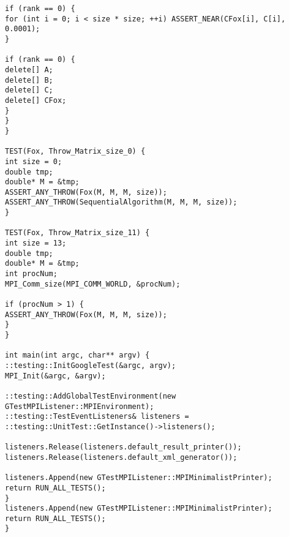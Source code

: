 \documentclass{report}
\begin{document}
\begin{lstlisting}
if (rank == 0) {
for (int i = 0; i < size * size; ++i) ASSERT_NEAR(CFox[i], C[i], 0.0001);
}

if (rank == 0) {
delete[] A;
delete[] B;
delete[] C;
delete[] CFox;
}
}
}

TEST(Fox, Throw_Matrix_size_0) {
int size = 0;
double tmp;
double* M = &tmp;
ASSERT_ANY_THROW(Fox(M, M, M, size));
ASSERT_ANY_THROW(SequentialAlgorithm(M, M, M, size));
}

TEST(Fox, Throw_Matrix_size_11) {
int size = 13;
double tmp;
double* M = &tmp;
int procNum;
MPI_Comm_size(MPI_COMM_WORLD, &procNum);

if (procNum > 1) {
ASSERT_ANY_THROW(Fox(M, M, M, size));
}
}

int main(int argc, char** argv) {
::testing::InitGoogleTest(&argc, argv);
MPI_Init(&argc, &argv);

::testing::AddGlobalTestEnvironment(new GTestMPIListener::MPIEnvironment);
::testing::TestEventListeners& listeners =
::testing::UnitTest::GetInstance()->listeners();

listeners.Release(listeners.default_result_printer());
listeners.Release(listeners.default_xml_generator());

listeners.Append(new GTestMPIListener::MPIMinimalistPrinter);
return RUN_ALL_TESTS();
}
listeners.Append(new GTestMPIListener::MPIMinimalistPrinter);
return RUN_ALL_TESTS();
}
\end{lstlisting}
\end{document}
